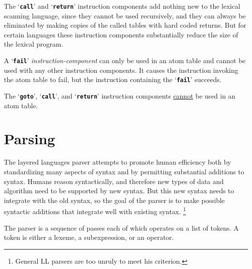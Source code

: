 \documentclass[12pt]{article}
\makeatletter
\newcommand{\TT}[1]{{\tt \bfseries #1}}
\newcommand{\ttmkey}[2]{\TT{#1}\index{#1@\TT{#1}!#2}}
\makeatother
\begin{document}
The `\TT{call}' and `\TT{return}' instruction components
add nothing new to the lexical scanning language, since they
cannot be used recursively,
and they can always be eliminated by making
copies of the called tables with hard coded returns.
But for certain languages these instruction components
substantially reduce the size of the lexical program.

A `\ttmkey{fail}{in lexical program}'
{\em instruction-component} can only be used in an atom
table and cannot be used with any other instruction components.
It causes the instruction invoking the atom table to fail, but
the instruction containing the `\TT{fail}' succeeds.

The `\TT{goto}', `\TT{call}', and `\TT{return}' instruction components
\underline{cannot} be used in an atom table.

\section{Parsing}

The layered languages parser attempts to promote human efficiency
both by standardizing many aspects of syntax and by permitting
substantial additions to syntax.  Humans reason
syntactically, and therefore new types of data and algorithm
need to be supported by new syntax.  But this new syntax needs to
integrate with the old syntax, so the goal of the parser is to make
possible syntactic additions that integrate well with existing syntax.%
\footnote{General LL parsers are too unruly to meet his criterion.}

The parser is a sequence of passes each of which operates on a list
of tokens.  A token is either a lexeme, a subexpression, or an operator.
\end{document}
